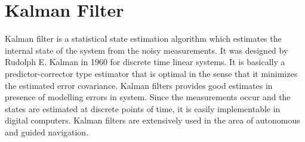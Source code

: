 \section{Kalman Filter}
Kalman filter is a statistical state estimation algorithm which estimates the internal state of the system from the noisy measurements. It was designed by Rudolph E. Kalman in 1960 for discrete time linear systems. It is basically a predictor-corrector type estimator that is optimal in the sense that it minimizes the estimated error covariance. Kalman filters provides good estimates in presence of modelling errors in system. Since the measurements occur and the states are estimated at discrete points of time, it is easily implementable in digital computers. Kalman filters are extensively used in the area of autonomous and guided navigation.

